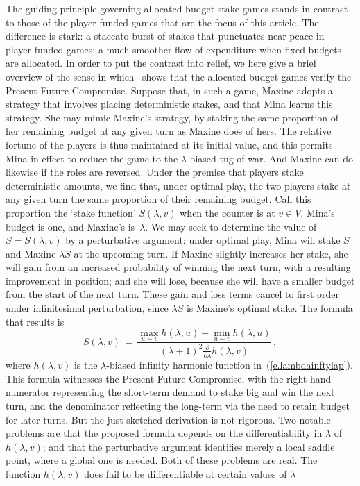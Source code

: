 \documentclass[letterpaper,11pt,oneside,reqno]{amsbook}
\numberwithin{figure}{chapter}
\theoremstyle{definition}
\theoremstyle{definition}
\theoremstyle{definition}
\theoremstyle{definition}
\theoremstyle{definition}
\begin{document}
The guiding principle governing allocated-budget stake games stands in contrast to those of the player-funded games that are the focus of this article. The difference is stark: a staccato burst of stakes that punctuates near peace in player-funded games; a much smoother flow of expenditure when fixed budgets are allocated.  In order to put the contrast into relief, we here give a brief overview of the sense in which~\cite{HP2022} shows that the allocated-budget games verify the Present-Future Compromise. Suppose that, in such a game, Maxine adopts a strategy that involves placing deterministic stakes, and that Mina learns this strategy. She may mimic Maxine's strategy, by staking the same proportion of her remaining budget at any given turn as Maxine does of hers. The relative fortune of the players is thus maintained at its initial value, and this permits Mina in effect to reduce the game to the $\lambda$-biased tug-of-war. And Maxine can do likewise if the roles are reversed. Under the premise that players stake deterministic amounts, we find that, under optimal play, the two players stake at any given turn the same proportion of their remaining budget. Call this proportion  the `stake function' $S(\lambda,v)$ when the counter is at $v \in V$, Mina's budget is one, and Maxine's is~$\lambda$. 
We may seek to determine the value of  $S = S(\lambda,v)$ by a perturbative argument: under optimal play, Mina will stake $S$ and Maxine $\lambda S$ at the upcoming turn. If Maxine slightly increases her stake, she will gain from an increased probability of winning the next turn, with a resulting improvement in position; and she will lose, because she will have a smaller budget from the start of the next turn. These gain and loss terms cancel to first order under infinitesimal perturbation, since $\lambda S$ is Maxine's optimal stake. The formula that results is
\begin{equation}\label{e.stakefunction}
 S(\lambda,v) \, = \, \frac{\max_{u \sim v} h(\lambda,u) - \min_{u \sim v} h(\lambda,u)}{(\lambda +1)^2 \tfrac{\partial}{\partial \lambda} h(\lambda,v)} \, ,
\end{equation}
where $h(\lambda,v)$ is the $\lambda$-biased infinity harmonic function in~(\ref{e.lambdainftylap}). This formula witnesses the Present-Future Compromise, with the right-hand numerator representing the short-term demand to stake big and win the next turn, and the denominator reflecting the long-term via the need to retain budget for later turns. But the just sketched derivation is not rigorous. Two notable problems are that the proposed formula depends on the differentiability in $\lambda$ of $h(\lambda,v)$; and that the perturbative argument identifies merely a local saddle point, where a global one is needed. Both of these problems are real. The function $h(\lambda,v)$ does fail to be differentiable at certain values of $\lambda$
\end{document}
